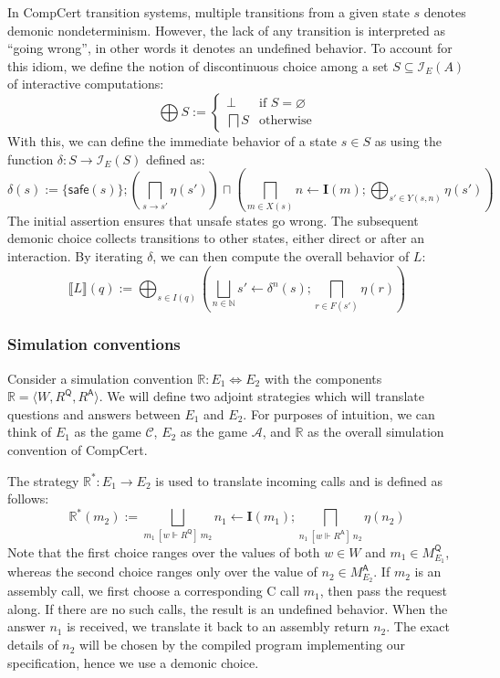 \documentclass[sigplan,10pt,review,anonymous]{acmart}
\newcommand{\kw}[1]{\ensuremath{ \mathsf{#1} }}
\newcommand{\ifr}[1]{\ [{#1}]\ }
\begin{document}
In CompCert transition systems,
multiple transitions from a given state $s$
denotes demonic nondeterminism.
However,
the lack of any transition is interpreted as ``going wrong'',
in other words it denotes an undefined behavior.
To account for this idiom,
we define the notion of discontinuous choice among
a set $S \subseteq \mathcal{I}_E(A)$ of interactive computations:
\[
    \bigoplus S :=
    \begin{cases}
      \bot & \mbox{if } S = \varnothing \\
      \bigsqcap S & \mbox{otherwise}
    \end{cases}
\]
With this,
we can define the immediate behavior of a state $s \in S$ as
using the function $\delta : S \rightarrow \mathcal{I}_E(S)$
defined as:
\[
  \delta(s) :=
    \{ \kw{safe}(s) \} ;
    \left( \bigsqcap_{s \rightarrow s'} \eta(s') \right)
    \sqcap
    \left( \bigsqcap_{m \in X(s)} n \leftarrow \mathbf{I}(m) ;
            \bigoplus_{s' \in Y(s, n)} \eta(s') \right)
\]
The initial assertion ensures that unsafe states go wrong.
The subsequent demonic choice
collects transitions to other states,
either direct or after an interaction.
By iterating $\delta$, we can then compute the overall behavior of $L$:
\[
   \llbracket L \rrbracket (q) :=
     \bigoplus_{s \in I(q)}
     \left(
     \bigsqcup_{n \in \mathbb{N}}
     s' \leftarrow \delta^n(s) ; \bigsqcap_{r \in F(s')} \eta(r)
     \right)
\]

\subsubsection{Simulation conventions}

Consider a simulation convention $\mathbb{R} : E_1 \Leftrightarrow E_2$
with the components $\mathbb{R} = \langle W, R^\kw{Q}, R^\kw{A} \rangle$.
We will define two adjoint strategies
which will translate questions and answers between
$E_1$ and $E_2$.
For purposes of intuition,
we can think of $E_1$ as the game $\mathcal{C}$,
$E_2$ as the game $\mathcal{A}$,
and $\mathbb{R}$ as the overall simulation convention of CompCert.

The strategy $\mathbb{R}^* : E_1 \rightarrow E_2$
is used to translate incoming calls
and is defined as follows:
\[
    \mathbb{R}^*(m_2) :=
       \bigsqcup_{m_1 \ifr{w \Vdash R^\kw{Q}} m_2}
       n_1 \leftarrow \mathbf{I}(m_1) ;
       \bigsqcap_{n_1 \ifr{w \Vdash R^\kw{A}} n_2}
       \eta(n_2)
\]
Note that the first choice ranges over the values of both
$w \in W$ and $m_1 \in M_{E_1}^\kw{Q}$,
whereas the second choice ranges only over the value of
$n_2 \in M_{E_2}^\kw{A}$.
If $m_2$ is an assembly call,
we first choose a corresponding C call $m_1$,
then pass the request along.
If there are no such calls,
the result is an undefined behavior.
When the answer $n_1$ is received,
we translate it back to an assembly return $n_2$.
The exact details of $n_2$ will be chosen by
the compiled program implementing our specification,
hence we use a demonic choice.
\end{document}
